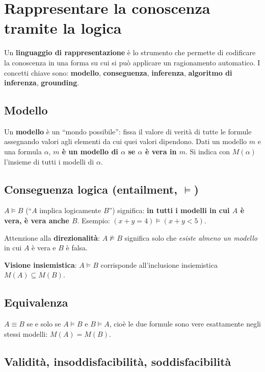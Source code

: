 \documentclass[11pt,a4paper]{report}
\begin{document}
\section{Rappresentare la conoscenza tramite la logica}

Un \textbf{linguaggio di rappresentazione} è lo strumento che permette di codificare la conoscenza in una forma su cui si può applicare un ragionamento automatico. I concetti chiave sono: \textbf{modello}, \textbf{conseguenza}, \textbf{inferenza}, \textbf{algoritmo di inferenza}, \textbf{grounding}.

\subsection*{Modello}

Un \textbf{modello} è un ``mondo possibile'': fissa il valore di verità di tutte le formule assegnando valori agli elementi da cui quei valori dipendono. Dati un modello $m$ e una formula $\alpha$, \textbf{$m$ è un modello di $\alpha$ se $\alpha$ è vera in $m$}. Si indica con $M(\alpha)$ l'insieme di tutti i modelli di $\alpha$.

\subsection*{Conseguenza logica (entailment, $\models$)}

$A \models B$ (``$A$ implica logicamente $B$'') significa: \textbf{in tutti i modelli in cui $A$ è vera, è vera anche $B$}. Esempio: $(x+y=4) \models (x+y<5)$.

Attenzione alla \textbf{direzionalità}: $A \not\models B$ significa solo che \emph{esiste almeno un modello} in cui $A$ è vera e $B$ è falsa.

\textbf{Visione insiemistica}: $A \models B$ corrisponde all'inclusione insiemistica $M(A) \subseteq M(B)$.

\subsection*{Equivalenza}

$A \equiv B$ se e solo se $A \models B$ e $B \models A$, cioè le due formule sono vere esattamente negli stessi modelli: $M(A)=M(B)$.

\subsection*{Validità, insoddisfacibilità, soddisfacibilità}
\end{document}

